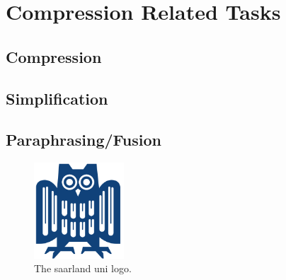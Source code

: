\section{Compression Related Tasks}


\subsection{Compression}
\lipsum[11-13]

\subsection{Simplification}


\subsection{Paraphrasing/Fusion}


\begin{figure}[H]
\centering
\includegraphics[width=0.3\textwidth]{eule.png}
\caption{The saarland uni logo.}
\label{fig:logo}
\end{figure}

\lipsum[14-15]